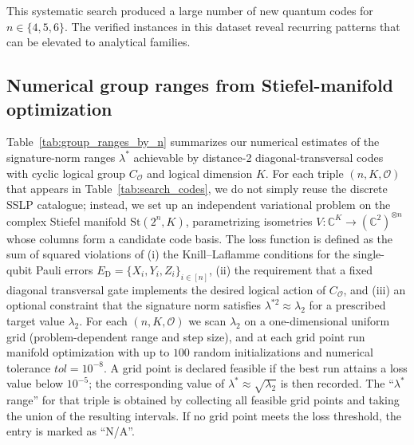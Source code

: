 \documentclass[pdflatex,sn-nature]{sn-jnl}%
\theoremstyle{thmstyleone}%
\theoremstyle{thmstyletwo}%
\theoremstyle{thmstylethree}%
\begin{document}
\begin{appendices}
This systematic search produced a large number of new quantum codes for $n \in \{4, 5, 6\}$. The verified instances in this dataset reveal recurring patterns that can be elevated to analytical families.



\subsection{Numerical group ranges from Stiefel-manifold optimization}

Table~\ref{tab:group_ranges_by_n} summarizes our numerical estimates of the signature-norm ranges $\lambda^*$ achievable by distance-2 diagonal-transversal codes with cyclic logical group $C_{\mathcal O}$ and logical dimension $K$.  For each triple $(n,K,\mathcal O)$ that appears in Table~\ref{tab:search_codes}, we do not simply reuse the discrete SSLP catalogue; instead, we set up an independent variational problem on the complex Stiefel manifold $\mathrm{St}(2^n,K)$, parametrizing isometries $V:\mathbb C^K\to(\mathbb C^2)^{\otimes n}$ whose columns form a candidate code basis.  The loss function is defined as the sum of squared violations of (i) the Knill–Laflamme conditions for the single-qubit Pauli errors $E_{\mathrm D}=\{X_i,Y_i,Z_i\}_{i\in[n]}$, (ii) the requirement that a fixed diagonal transversal gate implements the desired logical action of $C_{\mathcal O}$, and (iii) an optional constraint that the signature norm satisfies $\lambda^{*2}\approx\lambda_2$ for a prescribed target value $\lambda_2$.  For each $(n,K,\mathcal O)$ we scan $\lambda_2$ on a one-dimensional uniform grid (problem-dependent range and step size), and at each grid point run manifold optimization with up to $100$ random initializations and numerical tolerance $tol=10^{-8}$.  A grid point is declared feasible if the best run attains a loss value below $10^{-5}$; the corresponding value of $\lambda^*\approx\sqrt{\lambda_2}$ is then recorded.  The “$\lambda^*$ range” for that triple is obtained by collecting all feasible grid points and taking the union of the resulting intervals.  If no grid point meets the loss threshold, the entry is marked as “N/A”.

\begin{table}[t]
\centering
\footnotesize
\setlength{\tabcolsep}{5.5pt}
\renewcommand{\arraystretch}{0.92}

\caption{Signature-norm ranges $\lambda^*$ realized by distance-2 diagonal-transversal codes
from Table~\ref{tab:search_codes}. For each logical dimension $K$, cyclic logical order
$\mathcal O$ and length $n$, we collect all verified codes (over all SSLP parameters
$m,\mathbf w,\mathbf S$) and report the interval of $\lambda^*$ values observed so far.
A singleton $\{\lambda_0^*\}$ indicates that all such codes share the same signature norm;
``N/A'' means that no valid code was found for the specified triple $(n, K,\mathcal O)$.}
\label{tab:group_ranges_by_n}


\end{table}
\end{appendices}
\end{document}
